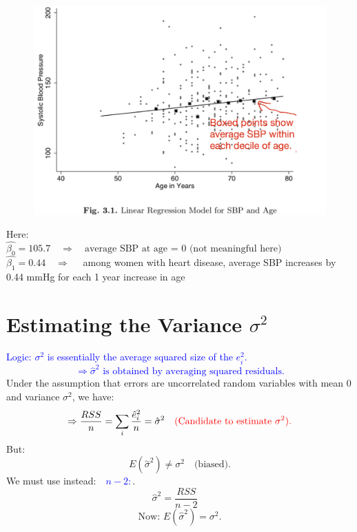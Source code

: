 \documentclass[14pt]{extarticle}
\begin{document}
\begin{figure}[H]
    \centering
    \includegraphics[width=1\textwidth]{fig5.png}
\end{figure}
\noindent
Here:\\
$
\hat{\beta_0} = 105.7 \quad \Rightarrow \quad \text{average SBP at age = 0 (not meaningful here)}
$\\
$
\hat{\beta_1} = 0.44 \quad \Rightarrow \quad$ among women with heart disease, average SBP increases by 0.44 mmHg for each 1 year increase in age

\section*{Estimating the Variance $\sigma^2$}

\textcolor{blue}{Logic: $\sigma^2$ is essentially the average squared size of the $e_i^2$. 
\[
\Rightarrow \hat{\sigma}^2 \text{ is obtained by averaging squared residuals}.
\]
}
Under the assumption that errors are uncorrelated random variables with mean 0 and variance $\sigma^2$, we have:
\[
\Rightarrow \frac{RSS}{n} = \sum_{i} \frac{\hat{e}_i^2}{n} = \hat{\sigma}^2
\quad 
\textcolor{red}{\text{(Candidate to estimate } \sigma^2\text{)}.}
\]
But:
\[
E({\overset{\sim}{\sigma}}^2) \neq \sigma^2 \quad \text{(biased)}.
\]
We must use instead:\textcolor{blue}{$\quad n-2 : $}.
\[
\hat{\sigma}^2 = \frac{RSS}{n-2}\quad
\]
\[
\text{Now: }E(\hat{\sigma}^2) = \sigma^2.
\]
\end{document}
